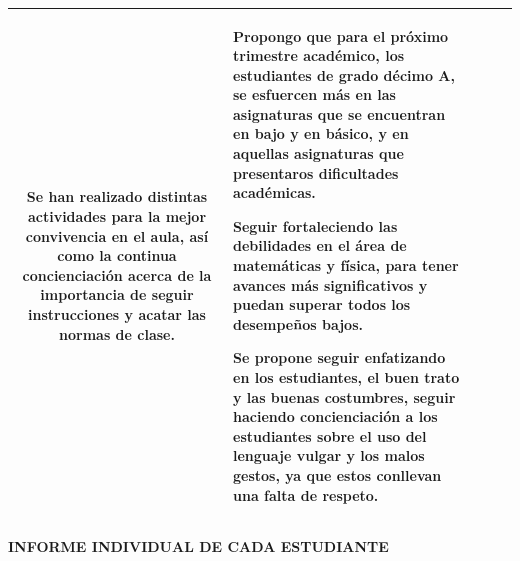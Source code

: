 \documentclass[spanish,11pt,a4paper]{article}
\begin{document}
{\begin{tabular}{|c|p{4cm}|p{4cm}|p{4cm}|p{4cm}|}
			Se han realizado distintas actividades para la mejor convivencia en el aula, así como la continua concienciación acerca de la importancia de seguir instrucciones y acatar las normas de clase. &
			
			Propongo  que para el próximo trimestre académico, los estudiantes de grado décimo A, se esfuercen más en las asignaturas que se encuentran en bajo y en básico, y en aquellas asignaturas que presentaros dificultades académicas.
			
			Seguir fortaleciendo las debilidades en el área de matemáticas y física, para tener avances más significativos y puedan superar todos los desempeños bajos.
			
			Se propone seguir enfatizando en los estudiantes, el buen trato y las buenas costumbres, seguir haciendo concienciación a los estudiantes sobre el uso del lenguaje vulgar y los malos gestos, ya que estos conllevan una falta de respeto.
			\\
			\hline
	\end{tabular}}
	\newpage
	
	\textbf{INFORME INDIVIDUAL DE CADA ESTUDIANTE}
	
\end{document}
